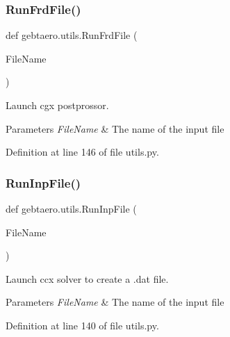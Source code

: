 \subsubsection{\texorpdfstring{Run\+Frd\+File()}{RunFrdFile()}}
{\footnotesize\ttfamily def gebtaero.\+utils.\+Run\+Frd\+File (\begin{DoxyParamCaption}\item[{}]{File\+Name }\end{DoxyParamCaption})}



Launch cgx postprossor. 


\begin{DoxyParams}{Parameters}
{\em File\+Name} & The name of the input file \\
\hline
\end{DoxyParams}


Definition at line 146 of file utils.\+py.

\mbox{\label{namespacegebtaero_1_1utils_a74be96ae0691643c4e6c459e14360464}} 
\subsubsection{\texorpdfstring{Run\+Inp\+File()}{RunInpFile()}}
{\footnotesize\ttfamily def gebtaero.\+utils.\+Run\+Inp\+File (\begin{DoxyParamCaption}\item[{}]{File\+Name }\end{DoxyParamCaption})}



Launch ccx solver to create a .dat file. 


\begin{DoxyParams}{Parameters}
{\em File\+Name} & The name of the input file \\
\hline
\end{DoxyParams}


Definition at line 140 of file utils.\+py.

\mbox{\label{namespacegebtaero_1_1utils_a248e0abbec4c02bcb7e75fea0f400c25}} 
